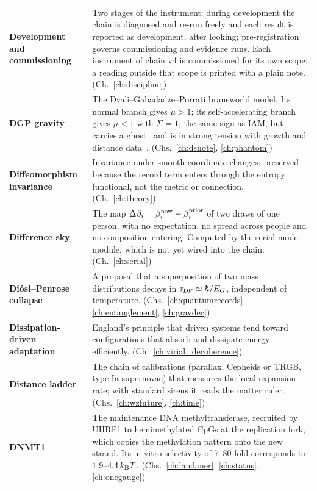 {\begin{longtable}{@{}>{\raggedright\arraybackslash}p{}>{\raggedright\arraybackslash}p{}@{}}
\textbf{Development and commissioning} & Two stages of the instrument: during development the chain is diagnosed and re-run freely and each result is reported as development, after looking; pre-registration governs commissioning and evidence runs. Each instrument of chain v4 is commissioned for its own scope; a reading outside that scope is printed with a plain note. {\footnotesize(Ch.~\ref{ch:discipline})}\\[1pt]
\textbf{DGP gravity} & The Dvali--Gabadadze--Porrati braneworld model. Its normal branch gives $\mu>1$; its self-accelerating branch gives $\mu<1$ with $\Sigma=1$, the same sign as IAM, but carries a ghost~\cite{Gorbunov2006,Koyama2007} and is in strong tension with growth and distance data~\cite{Fang2008}. {\footnotesize(Chs.~\ref{ch:dsnote}, \ref{ch:phantom})}\\[1pt]
\textbf{Diffeomorphism invariance} & Invariance under smooth coordinate changes; preserved because the record term enters through the entropy functional, not the metric or connection. {\footnotesize(Ch.~\ref{ch:theory})}\\[1pt]
\textbf{Difference sky} & The map $\Delta\beta_i=\beta^{\rm now}_i-\beta^{\rm prior}_i$ of two draws of one person, with no expectation, no spread across people and no composition entering. Computed by the serial-mode module, which is not yet wired into the chain. {\footnotesize(Ch.~\ref{ch:serial})}\\[1pt]
\textbf{Di\'osi--Penrose collapse} & A proposal that a superposition of two mass distributions decays in $\tau_{\rm DP}\simeq\hbar/E_G$, independent of temperature. {\footnotesize(Chs.~\ref{ch:quantumrecords}, \ref{ch:entanglement}, \ref{ch:gravdec})}\\[1pt]
\textbf{Dissipation-driven adaptation} & England's principle that driven systems tend toward configurations that absorb and dissipate energy efficiently. {\footnotesize(Ch.~\ref{ch:virial_decoherence})}\\[1pt]
\textbf{Distance ladder} & The chain of calibrations (parallax, Cepheids or TRGB, type Ia supernovae) that measures the local expansion rate; with standard sirens it reads the matter ruler. {\footnotesize(Chs.~\ref{ch:wzfuture}, \ref{ch:time})}\\[1pt]
\textbf{DNMT1} & The maintenance DNA methyltransferase, recruited by UHRF1 to hemimethylated CpGs at the replication fork, which copies the methylation pattern onto the new strand. Its in-vitro selectivity of 7--80-fold corresponds to $1.9$--$4.4\,k_{\mathrm B} T$. {\footnotesize(Chs.~\ref{ch:landauer}, \ref{ch:status}, \ref{ch:onegauge})}\\[1pt]

\end{longtable}}
